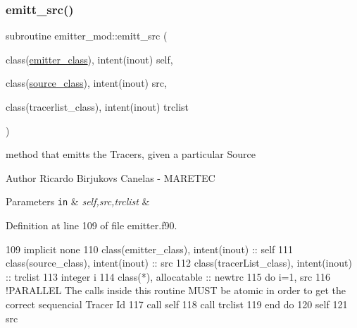 \subsubsection{\texorpdfstring{emitt\+\_\+src()}{emitt\_src()}}
{\footnotesize\ttfamily subroutine emitter\+\_\+mod\+::emitt\+\_\+src (\begin{DoxyParamCaption}\item[{class(\mbox{\hyperlink{structemitter__mod_1_1emitter__class}{emitter\+\_\+class}}), intent(inout)}]{self,  }\item[{class(\mbox{\hyperlink{structsources__mod_1_1source__class}{source\+\_\+class}}), intent(inout)}]{src,  }\item[{class(tracerlist\+\_\+class), intent(inout)}]{trclist }\end{DoxyParamCaption})\hspace{0.3cm}{\ttfamily [private]}}



method that emitts the Tracers, given a particular Source 

\begin{DoxyAuthor}{Author}
Ricardo Birjukovs Canelas -\/ M\+A\+R\+E\+T\+EC 
\end{DoxyAuthor}

\begin{DoxyParams}[1]{Parameters}
\mbox{\tt in}  & {\em self,src,trclist} & \\
\hline
\end{DoxyParams}


Definition at line 109 of file emitter.\+f90.


\begin{DoxyCode}
109     \textcolor{keywordtype}{implicit none}
110     \textcolor{keywordtype}{class}(emitter\_class), \textcolor{keywordtype}{intent(inout)} :: self
111     \textcolor{keywordtype}{class}(source\_class), \textcolor{keywordtype}{intent(inout)}  :: src
112     \textcolor{keywordtype}{class}(tracerList\_class), \textcolor{keywordtype}{intent(inout)}   :: trclist
113     \textcolor{keywordtype}{integer} i
114     \textcolor{keywordtype}{class}(*), \textcolor{keywordtype}{allocatable} :: newtrc
115     \textcolor{keywordflow}{do} i=1, src%
116         \textcolor{comment}{!PARALLEL The calls inside this routine MUST be atomic in order to get the correct sequencial
       Tracer Id}
117         \textcolor{keyword}{call }self%
118         \textcolor{keyword}{call }trclist%
119 \textcolor{keywordflow}{    end do}
120     self%
121     src%
\end{DoxyCode}
\mbox{\label{namespaceemitter__mod_a6376ad0f8e1739b29caf672aa0750373}} 
